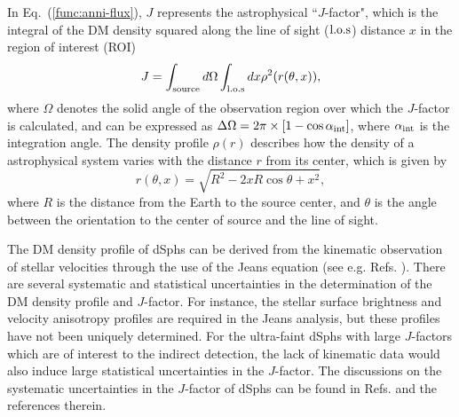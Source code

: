 \documentclass[12pt,aps,prd,amsmath,amssymb,showpacs,floats,floatfix,nofootinbib]{revtex4-1}
\begin{document}
In Eq.~(\ref{func:anni-flux}), $J$ represents the astrophysical ``$J$-factor",  which is the integral of the DM density squared along the line of sight ($\rm l.o.s$) distance $x$ in the region of interest (ROI)
\begin{equation}\label{func:jfactor}
J=\int_{\rm source}d\Omega\int_{\rm l.o.s} dx\rho^{2}(r(\theta,x)),
\end{equation}
where $\Omega$ denotes the solid angle of the observation region over which the $J$-factor is calculated,
and can be expressed as $\Delta \Omega=2\pi\times[1-\cos\alpha_{\rm int}]$, where $\alpha_{\rm int}$ is the integration angle.
The density profile $\rho{(r)}$ describes how the density of a astrophysical system varies with the distance $r$ from its center, which is given by
\begin{equation}
  r(\theta,x)=\sqrt{R^{2}-2xR\cos\theta+x^{2}},
\end{equation}
where $R$ is the distance from the Earth to the source center, and $\theta$ is the angle between the orientation to the center of source and the line of sight.

The DM density profile of dSphs can be derived from the kinematic observation of stellar velocities through the use of the Jeans equation (see e.g. Refs. \cite{Evans:2003sc,Strigari:2007at,Martinez:2009jh}). There are several systematic and statistical uncertainties in the determination of the DM density profile and $J$-factor. For instance, the stellar surface brightness and velocity anisotropy profiles are required in the Jeans analysis, but these profiles have not been uniquely determined. For the ultra-faint dSphs with large $J$-factors which are of interest to the indirect detection, the lack of kinematic data would also induce large statistical uncertainties in the $J$-factor. The discussions on the systematic uncertainties in the $J$-factor of dSphs can be found in Refs. \cite{Lefranc:2016dgx} and the references therein.
\end{document}
